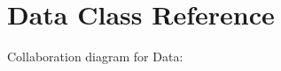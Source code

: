 \hypertarget{class_data}{}\section{Data Class Reference}
\label{class_data}


Collaboration diagram for Data\+:

